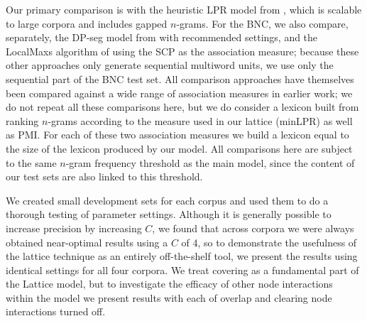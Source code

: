 \documentclass[11pt,letterpaper]{article}
\begin{document}
 Our primary comparison is with the heuristic LPR model from , which is scalable to large corpora and includes gapped $n$-grams. For the BNC, we also compare, separately, the DP-seg model from  with recommended settings, and the LocalMaxs algorithm of  using the SCP as the association measure; because these other approaches only generate sequential multiword units, we use only the sequential part of the BNC test set. All comparison approaches have themselves been compared against a wide range of association measures in earlier work; we do not repeat all these comparisons here, but we do consider a lexicon built from ranking $n$-grams according to the measure used in our lattice (minLPR) as well as PMI. For each of these two association measures we build a lexicon equal to the size of the lexicon produced by our model. All comparisons here are subject to the same $n$-gram frequency threshold as the main model, since the content of our test sets are also linked to this threshold.



We created small development sets for each corpus and used them to do a thorough testing of parameter settings. Although it is generally possible to increase precision by increasing $C$, we found that across corpora we were always obtained near-optimal results using a $C$ of 4, so to demonstrate the usefulness of the lattice technique as an entirely off-the-shelf tool, we present the results using identical settings for all four corpora. We treat covering as a fundamental part of the Lattice model, but to investigate the efficacy of other node interactions within the model we present results with each of overlap and clearing node interactions turned off.
		
\end{document}

